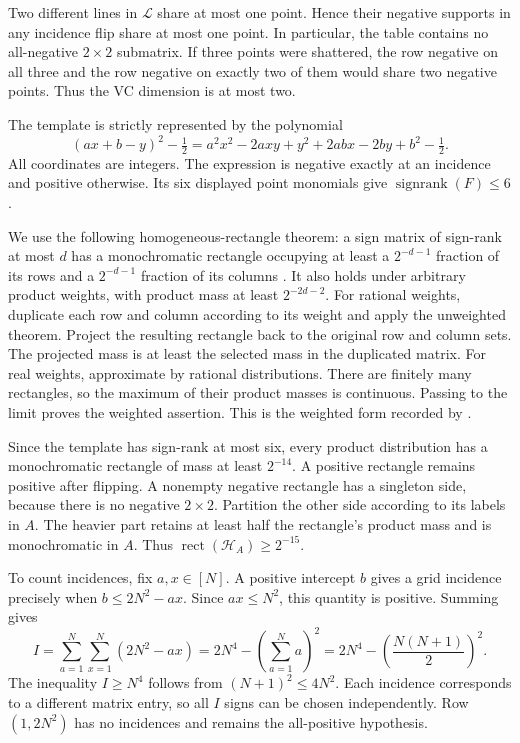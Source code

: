\documentclass[11pt,letterpaper,pmlr,twoside]{jmlr}
\newcommand{\Hc}{\mathcal H}
\newcommand{\Lc}{\mathcal L}
\newcommand{\sr}{\operatorname{signrank}}
\newcommand{\rect}{\operatorname{rect}}
\begin{document}
Two different lines in $\Lc$ share at most one point. Hence their negative supports in any incidence flip share at most one point. In particular, the table contains no all-negative $2\times2$ submatrix. If three points were shattered, the row negative on all three and the row negative on exactly two of them would share two negative points. Thus the VC dimension is at most two.

The template is strictly represented by the polynomial
\[
 (ax+b-y)^2-\tfrac12
 =a^2x^2-2axy+y^2+2abx-2by+b^2-\tfrac12.
\]
All coordinates are integers. The expression is negative exactly at an incidence and positive otherwise. Its six displayed point monomials give $\sr(F)\le6$.

We use the following homogeneous-rectangle theorem: a sign matrix of sign-rank at most $d$ has a monochromatic rectangle occupying at least a $2^{-d-1}$ fraction of its rows and a $2^{-d-1}$ fraction of its columns \citep{APP05}. It also holds under arbitrary product weights, with product mass at least $2^{-2d-2}$. For rational weights, duplicate each row and column according to its weight and apply the unweighted theorem. Project the resulting rectangle back to the original row and column sets. The projected mass is at least the selected mass in the duplicated matrix. For real weights, approximate by rational distributions. There are finitely many rectangles, so the maximum of their product masses is continuous. Passing to the limit proves the weighted assertion. This is the weighted form recorded by \citet[Theorem 1.9]{HHPTZ22}.

Since the template has sign-rank at most six, every product distribution has a monochromatic rectangle of mass at least $2^{-14}$. A positive rectangle remains positive after flipping. A nonempty negative rectangle has a singleton side, because there is no negative $2\times2$. Partition the other side according to its labels in $A$. The heavier part retains at least half the rectangle's product mass and is monochromatic in $A$. Thus $\rect(\Hc_A)\ge2^{-15}$.

To count incidences, fix $a,x\in[N]$. A positive intercept $b$ gives a grid incidence precisely when $b\le2N^2-ax$. Since $ax\le N^2$, this quantity is positive. Summing gives
\[
 I=\sum_{a=1}^{N}\sum_{x=1}^{N}(2N^2-ax)
 =2N^4-\left(\sum_{a=1}^{N}a\right)^2
 =2N^4-\left(\frac{N(N+1)}2\right)^2.
\]
The inequality $I\ge N^4$ follows from $(N+1)^2\le4N^2$. Each incidence corresponds to a different matrix entry, so all $I$ signs can be chosen independently. Row $(1,2N^2)$ has no incidences and remains the all-positive hypothesis.
\end{document}
